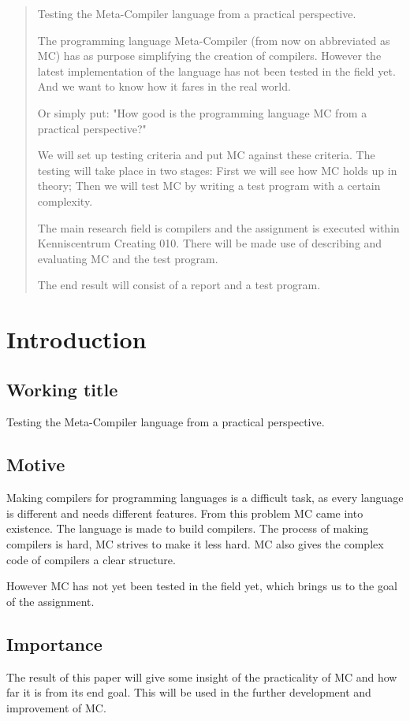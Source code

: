\begin{abstract}
   Testing the Meta-Compiler language from a practical perspective.

   The programming language Meta-Compiler (from now on abbreviated as MC) has as purpose simplifying the creation of compilers.
   However the latest implementation of the language has not been tested in the field yet. And we want to know how it fares in the real world.

   Or simply put: "How good is the programming language MC from a practical perspective?"

   We will set up testing criteria and put MC against these criteria.
   The testing will take place in two stages:
   First we will see how MC holds up in theory;
   Then we will test MC by writing a test program with a certain complexity.

   The main research field is compilers and the assignment is executed within Kenniscentrum Creating
   010.
   There will be made use of describing and evaluating MC and the test program.

   The end result will consist of a report and a test program.
\end{abstract}

\chapter{Introduction}
\section{Working title}
   Testing the Meta-Compiler language from a practical perspective.

\section{Motive}\label{sec:motivemandate}
Making compilers for programming languages is a difficult task, as every language is different and needs different features.
From this problem MC came into existence.
The language is made to build compilers.
The process of making compilers is hard, MC strives to make it less hard.
MC also gives the complex code of compilers a clear structure.

However MC has not yet been tested in the field yet, which brings us to the goal of the assignment.

\section{Importance}
The result of this paper will give some insight of the practicality of MC and how far it is from its end goal.
This will be used in the further development and improvement of MC.

